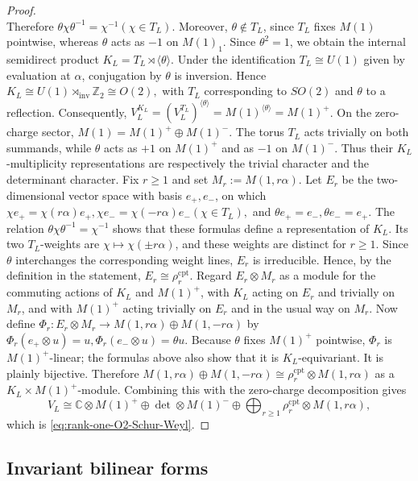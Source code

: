 \documentclass[10pt,a4paper]{amsart}
\numberwithin{equation}{section} \newtheorem{thm}{Theorem}[section] \newtheorem{lem}[thm]{Lemma} \newtheorem{ex}[thm]{Example} \newtheorem{prop}[thm]{Proposition} \newtheorem{cor}[thm]{Corollary} \newtheorem{defi}[thm]{Definition} \newtheorem{rmk}[thm]{Remark} \newtheorem{notation}[thm]{Notation}
\begin{document}
\begin{proof}
$$$$ Therefore $ \theta\chi\theta^{-1}=\chi^{-1} (\chi\in T_L). $ Moreover, \(\theta\notin T_L\), since \(T_L\) fixes \(M(1)\) pointwise, whereas \(\theta\) acts as \(-1\) on \(M(1)_1\). Since \(\theta^2=1\), we obtain the internal semidirect product $ K_L=T_L\rtimes\langle\theta\rangle. $ Under the identification \(T_L\cong U(1)\) given by evaluation at \(\alpha\), conjugation by \(\theta\) is inversion. Hence $ K_L\cong U(1)\rtimes_{\mathrm{inv}}\mathbb Z_2\cong O(2), $ with \(T_L\) corresponding to \(SO(2)\) and \(\theta\) to a reflection. Consequently, \(V_L^{K_L}=(V_L^{T_L})^{\langle\theta\rangle}=M(1)^{\langle\theta\rangle}=M(1)^+\). On the zero-charge sector, $ M(1)=M(1)^+\oplus M(1)^-. $ The torus \(T_L\) acts trivially on both summands, while \(\theta\) acts as \(+1\) on \(M(1)^+\) and as \(-1\) on \(M(1)^-\). Thus their \(K_L\)-multiplicity representations are respectively the trivial character and the determinant character. Fix \(r\ge1\) and set \(M_r:=M(1,r\alpha)\). Let \(E_r\) be the two-dimensional vector space with basis \(e_+,e_-\), on which $ \chi e_+=\chi(r\alpha)e_+, \chi e_-=\chi(-r\alpha)e_- (\chi\in T_L), $ and $ \theta e_+=e_-, \theta e_-=e_+. $ The relation \(\theta\chi\theta^{-1}=\chi^{-1}\) shows that these formulas define a representation of \(K_L\). Its two \(T_L\)-weights are \(\chi\mapsto\chi(\pm r\alpha)\), and these weights are distinct for \(r\ge1\). Since \(\theta\) interchanges the corresponding weight lines, \(E_r\) is irreducible. Hence, by the definition in the statement, $ E_r\cong\rho_r^{\mathrm{cpt}}. $ Regard \(E_r\otimes M_r\) as a module for the commuting actions of \(K_L\) and \(M(1)^+\), with \(K_L\) acting on \(E_r\) and trivially on \(M_r\), and with \(M(1)^+\) acting trivially on \(E_r\) and in the usual way on \(M_r\). Now define \(\Phi_r:E_r\otimes M_r\longrightarrow M(1,r\alpha)\oplus M(1,-r\alpha)\) by $ \Phi_r(e_+\otimes u)=u, \Phi_r(e_-\otimes u)=\theta u. $ Because \(\theta\) fixes \(M(1)^+\) pointwise, \(\Phi_r\) is \(M(1)^+\)-linear; the formulas above also show that it is \(K_L\)-equivariant. It is plainly bijective. Therefore \(M(1,r\alpha)\oplus M(1,-r\alpha)\cong\rho_r^{\mathrm{cpt}}\otimes M(1,r\alpha)\) as a \(K_L\times M(1)^+\)-module. Combining this with the zero-charge decomposition gives $$ V_L\cong \mathbb C\otimes M(1)^+ \oplus\det\otimes M(1)^- \oplus\bigoplus_{r\ge1} \rho_r^{\mathrm{cpt}}\otimes M(1,r\alpha), $$ which is \eqref{eq:rank-one-O2-Schur-Weyl}.
\end{proof}

\subsection{Invariant bilinear forms}
\label{subsec:Li-invariant}
\end{document}

